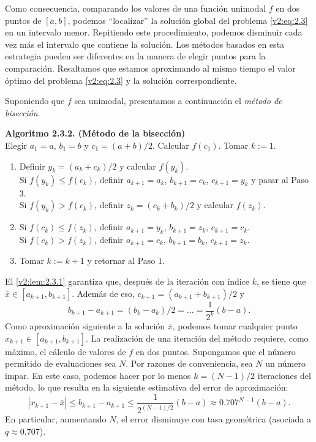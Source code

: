 Como consecuencia, comparando los valores de una función unimodal $f$ en dos puntos de $[a, b]$, podemos ``localizar'' la solución global del problema \eqref{v2:eq:2.3} en un intervalo menor. Repitiendo este procedimiento, podemos disminuir cada vez más el intervalo que contiene la solución. Los métodos basados en esta estrategia pueden ser diferentes en la manera de elegir puntos para la comparación. Resaltamos que estamos aproximando al mismo tiempo el valor óptimo del problema \eqref{v2:eq:2.3} y la solución correspondiente.

Suponiendo que $f$ sea unimodal, presentamos a continuación el \textit{método de bisección}.

\noindent \textbf{Algoritmo 2.3.2. (Método de la bisección)} \\
Elegir $a_1 = a$, $b_1 = b$ y $c_1 = (a + b)/2$. Calcular $f(c_1)$. Tomar $k := 1$.
\begin{enumerate}
    \item[1.] Definir $y_k = (a_k + c_k)/2$ y calcular $f(y_k)$. \\
    Si $f(y_k) \le f(c_k)$, definir $a_{k+1} = a_k$, $b_{k+1} = c_k$, $c_{k+1} = y_k$ y pasar al Paso 3. \\
    Si $f(y_k) > f(c_k)$, definir $z_k = (c_k + b_k)/2$ y calcular $f(z_k)$.
    \item[2.] Si $f(c_k) \le f(z_k)$, definir $a_{k+1} = y_k$, $b_{k+1} = z_k$, $c_{k+1} = c_k$. \\
    Si $f(c_k) > f(z_k)$, definir $a_{k+1} = c_k$, $b_{k+1} = b_k$, $c_{k+1} = z_k$.
    \item[3.] Tomar $k := k + 1$ y retornar al Paso 1.
\end{enumerate}

El \cref{v2:lem:2.3.1} garantiza que, después de la iteración con índice $k$, se tiene que $\bar{x} \in [a_{k+1}, b_{k+1}]$. Además de eso, $c_{k+1} = (a_{k+1} + b_{k+1})/2$ y
\[
    b_{k+1} - a_{k+1} = (b_k - a_k)/2 = \dots = \frac{1}{2^k}(b - a).
\]
Como aproximación siguiente a la solución $\bar{x}$, podemos tomar cualquier punto $x_{k+1} \in [a_{k+1}, b_{k+1}]$. La realización de una iteración del método requiere, como máximo, el cálculo de valores de $f$ en dos puntos. Supongamos que el número permitido de evaluaciones sea $N$. Por razones de conveniencia, sea $N$ un número impar. En este caso, podemos hacer por lo menos $k = (N - 1)/2$ iteraciones del método, lo que resulta en la siguiente estimativa del error de aproximación:
\[
    |x_{k+1} - \bar{x}| \le b_{k+1} - a_{k+1} \le \frac{1}{2^{(N-1)/2}}(b - a) \approx 0.707^{N-1}(b - a).
\]
En particular, aumentando $N$, el error disminuye con tasa geométrica (asociada a $q \approx 0.707$).


